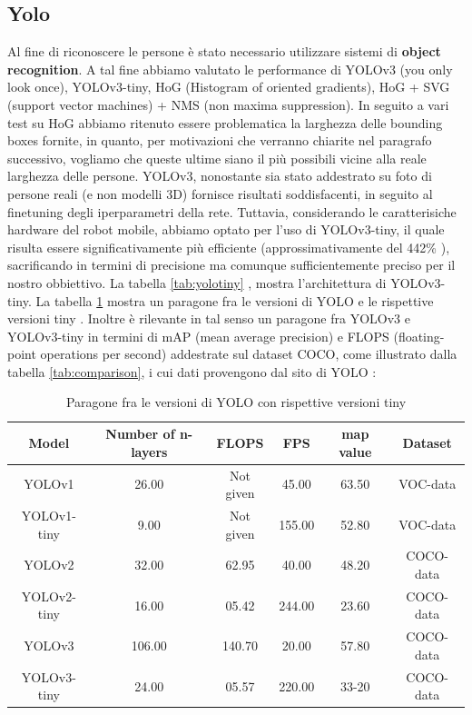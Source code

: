\documentclass[a4paper]{article}
\begin{document}
	\subsection{Yolo}\label{subsec:Yolo}
	Al fine di riconoscere le persone è stato necessario utilizzare sistemi di \textbf{object recognition}. A tal fine abbiamo valutato le performance di YOLOv3 (you only look once), YOLOv3-tiny, HoG (Histogram of oriented gradients), HoG + SVG (support vector machines) + NMS (non maxima suppression).
	In seguito a vari test su HoG abbiamo ritenuto essere problematica la larghezza delle bounding boxes fornite, in quanto, per motivazioni che verranno chiarite nel paragrafo successivo, vogliamo che queste ultime siano il più possibili vicine alla reale larghezza delle persone. YOLOv3, nonostante sia stato addestrato su foto di persone reali (e non modelli 3D) fornisce risultati soddisfacenti, in seguito al finetuning degli iperparametri della rete. Tuttavia, considerando le caratterisiche hardware del robot mobile, abbiamo optato per l'uso di YOLOv3-tiny, il quale risulta essere significativamente più efficiente (approssimativamente del 442\% \cite{tiny_yolo}), sacrificando in termini di precisione ma comunque sufficientemente preciso per il nostro obbiettivo. La tabella \ref{tab:yolotiny} \cite{He2019TFYOLOAI}, mostra l'architettura di YOLOv3-tiny. La tabella \ref{tab:comparisonversions} mostra un paragone fra le versioni di YOLO e le rispettive versioni tiny \cite{tiny_yolo}. Inoltre è rilevante in tal senso un paragone fra YOLOv3 e YOLOv3-tiny in termini di mAP (mean average precision) e FLOPS (floating-point operations per second) addestrate sul dataset COCO, come illustrato dalla tabella \ref{tab:comparison}, i cui dati provengono dal sito di YOLO \cite{yolo}:
	
	\begin{table}[htpb]
		\centering
		\begin{tabular}{ |c|c|c|c|c|c| } 
			\hline
			Model & Number of n-layers & FLOPS & FPS & map value & Dataset \\
			\hline	
			YOLOv1    		& 26.00   &  Not given  &  45.00   & 63.50 & VOC-data  \\ 
			YOLOv1-tiny     & 9.00    &  Not given  &  155.00  & 52.80 & VOC-data  \\ 
			YOLOv2    		& 32.00   &  62.95      &  40.00   & 48.20 & COCO-data \\ 
			YOLOv2-tiny   	& 16.00   &  05.42	    &  244.00  & 23.60 & COCO-data \\
			YOLOv3    		& 106.00  &  140.70	    &  20.00   & 57.80 & COCO-data \\
			YOLOv3-tiny    	& 24.00   &  05.57	    &  220.00  & 33-20 & COCO-data \\
			\hline
		\end{tabular}
		\caption{Paragone fra le versioni di YOLO con rispettive versioni tiny}
		\label{tab:comparisonversions}
	\end{table}
	
\end{document}

